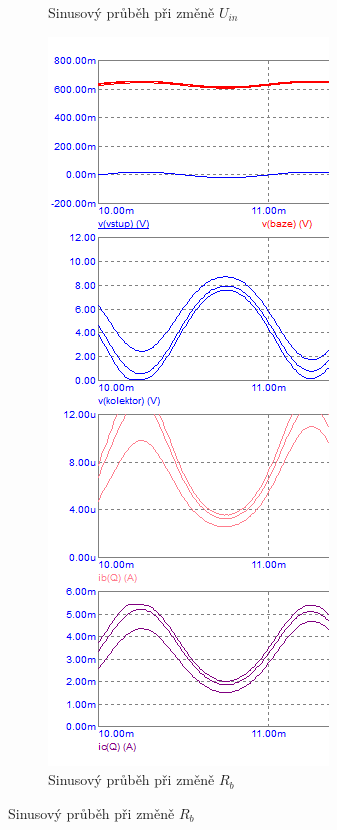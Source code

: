 \documentclass{article}
\begin{document}
\begin{figure}[H]
\begin{minipage}[t]{0.471\textwidth}
\begin{figure}[H]
      \caption{\label{prac_bod_sim_1} Sinusový průběh při změně \(U_{in}\)}
    \end{figure}
  \end{minipage}
  \hfill
	\begin{minipage}[t]{0.4\textwidth}
    \begin{figure}[H]
      \includegraphics[width=\textwidth]{PC/BJT/Tranzient_analyza_4.png}
      \caption{\label{prac_bod_sim_1} Sinusový průběh při změně \(R_b\)}
    \end{figure}
  \end{minipage}
\end{figure}
\end{document}

